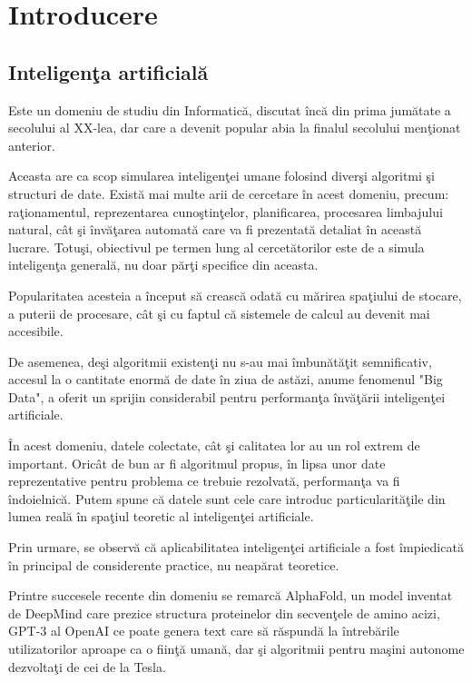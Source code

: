 \chapter{Introducere}

\section{Inteligenţa artificială}

Este un domeniu de studiu din Informatică, discutat încă din prima jumătate a 
secolului al XX-lea, dar care a devenit popular abia la finalul secolului menţionat 
anterior.

Aceasta are ca scop simularea inteligenţei umane folosind diverşi algoritmi şi 
structuri de date. Există mai multe arii de cercetare în acest domeniu, precum: 
raţionamentul, reprezentarea cunoştinţelor, planificarea, procesarea limbajului 
natural, cât şi învăţarea automată care va fi prezentată detaliat în această lucrare.
Totuşi, obiectivul pe termen lung al cercetătorilor este de a simula inteligenţa 
generală, nu doar părţi specifice din aceasta.

Popularitatea acesteia a început să crească odată cu mărirea spaţiului de stocare,
a puterii de procesare, cât şi cu faptul că sistemele de calcul au devenit mai 
accesibile. 

De asemenea, deşi algoritmii existenţi nu s-au mai îmbunătăţit 
semnificativ, accesul la o cantitate enormă de date în ziua de astăzi, anume 
fenomenul "Big Data", a oferit un sprijin considerabil pentru performanţa 
învăţării inteligenţei artificiale\cite{ai-history}.

În acest domeniu, datele colectate, cât şi calitatea lor au un rol extrem de important.
Oricât de bun ar fi algoritmul propus, în lipsa unor date reprezentative pentru 
problema ce trebuie rezolvată, performanţa va fi îndoielnică. Putem spune că datele 
sunt cele care introduc particularităţile din lumea reală în spaţiul teoretic 
al inteligenţei artificiale.

Prin urmare, se observă că aplicabilitatea inteligenţei artificiale 
a fost împiedicată în principal de considerente practice, nu neapărat teoretice.

Printre succesele recente din domeniu se remarcă AlphaFold, un model 
inventat de DeepMind care prezice structura proteinelor din secvenţele 
de amino acizi, GPT-3 al OpenAI ce poate genera text care să răspundă la 
întrebările utilizatorilor aproape ca o fiinţă umană, dar şi algoritmii 
pentru maşini autonome dezvoltaţi de cei de la Tesla.

